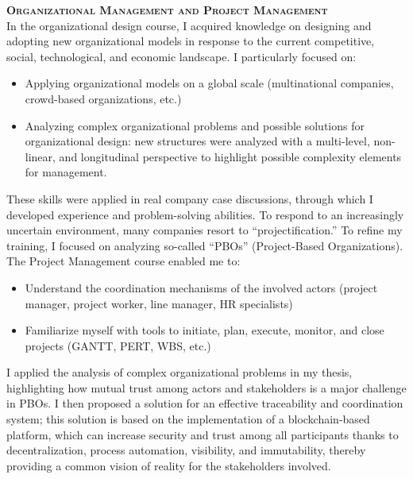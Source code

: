 \is
\textbf{\textsc{Organizational Management and Project Management}} \\
In the organizational design course, I acquired knowledge on designing and adopting new organizational models in response to the current competitive, social, technological, and economic landscape. I particularly focused on:
\begin{itemize}
    \item Applying organizational models on a global scale (multinational companies, crowd-based organizations, etc.)
    \item Analyzing complex organizational problems and possible solutions for organizational design: new structures were analyzed with a multi-level, non-linear, and longitudinal perspective to highlight possible complexity elements for management.
\end{itemize}
These skills were applied in real company case discussions, through which I developed experience and problem-solving abilities.
To respond to an increasingly uncertain environment, many companies resort to “projectification.” To refine my training, I focused on analyzing so-called “PBOs” (Project-Based Organizations).
The Project Management course enabled me to:
\begin{itemize}
    \item Understand the coordination mechanisms of the involved actors (project manager, project worker, line manager, HR specialists)
    \item Familiarize myself with tools to initiate, plan, execute, monitor, and close projects (GANTT, PERT, WBS, etc.)
\end{itemize}
I applied the analysis of complex organizational problems in my thesis, highlighting how mutual trust among actors and stakeholders is a major challenge in PBOs. I then proposed a solution for an effective traceability and coordination system; this solution is based on the implementation of a blockchain-based platform, which can increase security and trust among all participants thanks to decentralization, process automation, visibility, and immutability, thereby providing a common vision of reality for the stakeholders involved.
